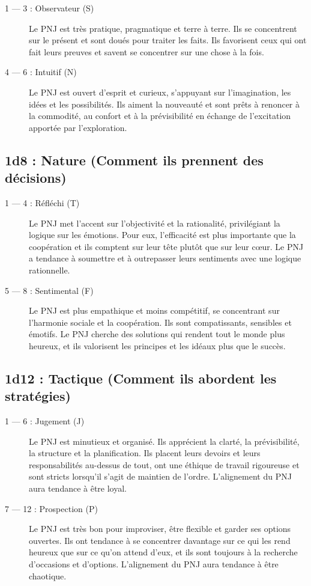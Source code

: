 \documentclass{article}
\begin{document}
\begin{description}
	\item[1 --- 3 : Observateur (S)] Le PNJ est très pratique, pragmatique et terre à terre. Ils se concentrent sur le présent et sont doués pour traiter les faits. Ils favorisent ceux qui ont fait leurs preuves et savent se concentrer sur une chose à la fois.
	\item[4 --- 6 : Intuitif (N)] Le PNJ est ouvert d'esprit et curieux, s'appuyant sur l'imagination, les idées et les possibilités. Ils aiment la nouveauté et sont prêts à renoncer à la commodité, au confort et à la prévisibilité en échange de l'excitation apportée par l'exploration.
\end{description}

\subsection*{1d8 : Nature (Comment ils prennent des décisions)}

\begin{description}
	\item[1 --- 4 : Réfléchi (T)] Le PNJ met l'accent sur l'objectivité et la rationalité, privilégiant la logique sur les émotions. Pour eux, l'efficacité est plus importante que la coopération et ils comptent sur leur tête plutôt que sur leur cœur. Le PNJ a tendance à soumettre et à outrepasser leurs sentiments avec une logique rationnelle.
	\item[5 --- 8 : Sentimental (F)] Le PNJ est plus empathique et moins compétitif, se concentrant sur l'harmonie sociale et la coopération. Ils sont compatissants, sensibles et émotifs. Le PNJ cherche des solutions qui rendent tout le monde plus heureux, et ils valorisent les principes et les idéaux plus que le succès.
\end{description}

\subsection*{1d12 : Tactique (Comment ils abordent les stratégies)}

\begin{description}
	\item[1 --- 6 : Jugement (J)] Le PNJ est minutieux et organisé. Ils apprécient la clarté, la prévisibilité, la structure et la planification. Ils placent leurs devoirs et leurs responsabilités au-dessus de tout, ont une éthique de travail rigoureuse et sont stricts lorsqu'il s'agit de maintien de l'ordre. L'alignement du PNJ aura tendance à être loyal.
	\item[7 --- 12 : Prospection (P)] Le PNJ est très bon pour improviser, être flexible et garder ses options ouvertes. Ils ont tendance à se concentrer davantage sur ce qui les rend heureux que sur ce qu'on attend d'eux, et ils sont toujours à la recherche d'occasions et d'options. L'alignement du PNJ aura tendance à être chaotique.
\end{description}
\end{document}
